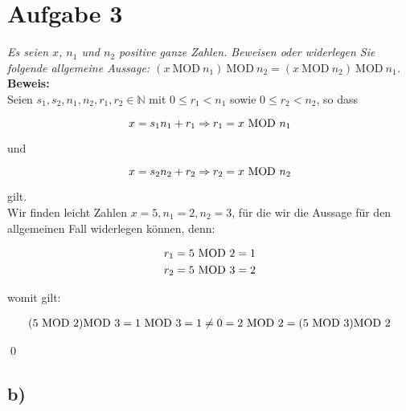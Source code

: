 \chapter{Aufgabe 3}

\textit{Es seien $x$, $n_1$ und $n_2$ positive ganze Zahlen. Beweisen oder widerlegen Sie
folgende allgemeine Aussage: $(x \ \text{MOD} \ n_1) \ \text{MOD} \ n_2 = (x \ \text{MOD} \ n_2) \ \text{MOD} \ n_1$.}\\

\noindent
\textbf{Beweis:}\\

\noindent
Seien $s_1, s_2, n_1, n_2, r_1, r_2 \in \mathbb{N}$ mit $0 \leq r_1 < n_1$ sowie $0 \leq r_2 < n_2$, so dass

\begin{equation}\notag
    x = s_1 n_1 + r_1 \Rightarrow r_1 = x \ \text{MOD} \ n_1
\end{equation}

\noindent
und

\begin{equation}\notag
x = s_2 n_2 + r_2 \Rightarrow r_2 = x \ \text{MOD} \ n_2
\end{equation}

\noindent
gilt.\\

\noindent
Wir finden leicht Zahlen $x = 5, n_1 = 2, n_2 = 3$, für die wir die Aussage für den allgemeinen Fall widerlegen können, denn:

\begin{equation}\notag
    \begin{split}
        r_1 &= 5 \ \text{MOD} \ 2 = 1\\
        r_2 &= 5 \ \text{MOD} \ 3 = 2
    \end{split}
\end{equation}

\noindent
womit gilt:

\begin{equation}\notag
\begin{split}
(5 \ \text{MOD} \ 2) \text{MOD} \ 3  = 1 \ \text{MOD} \ 3 = 1 \neq 0 = 2 \ \text{MOD} \ 2 = (5 \ \text{MOD} \ 3) \text{MOD} \ 2
\end{split}
\end{equation}


\qed


\section{b)}

